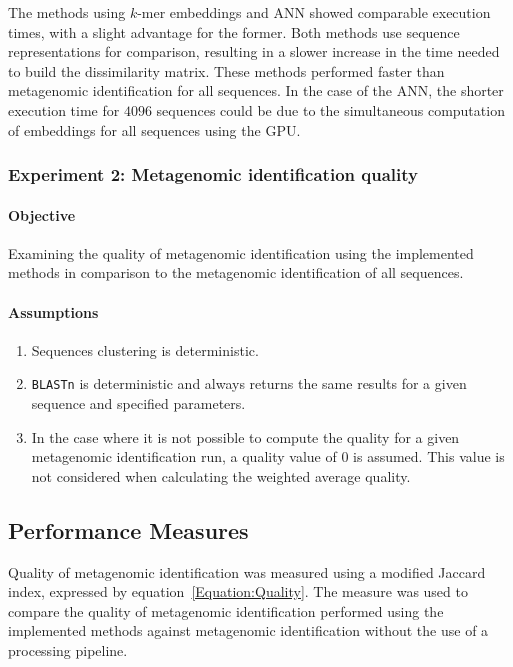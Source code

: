 \documentclass[pdflatex,sn-vancouver-num]{sn-jnl}%
\begin{document}
                The methods using $k$-mer embeddings and ANN showed comparable execution times, with a slight advantage for the former. Both methods use sequence representations for comparison, resulting in a slower increase in the time needed to build the dissimilarity matrix. These methods performed faster than metagenomic identification for all sequences. In the case of the ANN, the shorter execution time for $4096$ sequences could be due to the simultaneous computation of embeddings for all sequences using the GPU.

            \subsubsection{Experiment 2: Metagenomic identification quality}
                \paragraph{Objective}
                Examining the quality of metagenomic identification using the implemented methods in comparison to the metagenomic identification of all sequences.

                \paragraph{Assumptions}
                \begin{enumerate}
                    \item {
                        Sequences clustering is deterministic.
                    }
                    \item {
                        \texttt{BLASTn} is deterministic and always returns the same results for a given sequence and specified parameters.
                    }
                    \item {
                        In the case where it is not possible to compute the quality for a given metagenomic identification run, a quality value of $0$ is assumed. This value is not considered when calculating the weighted average quality.
                    }
                  \end{enumerate}


        \subsection{Performance Measures}
            Quality of metagenomic identification was measured using a modified Jaccard index, expressed by equation~\ref{Equation:Quality}. The measure was used to compare the quality of metagenomic identification performed using the implemented methods against metagenomic identification without the use of a processing pipeline.
\end{document}
